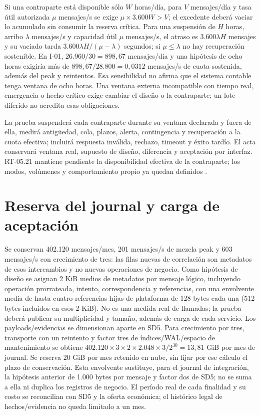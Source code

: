 Si una contraparte está disponible sólo $W$ horas/día, para $V$ mensajes/día y tasa útil autorizada $\mu$ mensajes/s se exige $\mu\times3.600W>V$; el excedente deberá vaciar lo acumulado sin consumir la reserva crítica. Para una suspensión de $H$ horas, arribo $\lambda$ mensajes/s y capacidad útil $\mu$ mensajes/s, el atraso es $3.600\lambda H$ mensajes y su vaciado tarda $3.600\lambda H/(\mu-\lambda)$ segundos; si $\mu\leq\lambda$ no hay recuperación sostenible. En I-01, $26.960/30=898,67$ mensajes/día y una hipótesis de ocho horas exigiría más de $898,67/28.800=0,0312$ mensajes/s de cuota sostenida, además del peak y reintentos. Esa sensibilidad no afirma que el sistema contable tenga ventana de ocho horas. Una ventana externa incompatible con tiempo real, emergencia o hecho crítico exige cambiar el diseño o la contraparte; un lote diferido no acredita esas obligaciones.

La prueba suspenderá cada contraparte durante su ventana declarada y fuera de ella, medirá antigüedad, cola, plazos, alerta, contingencia y recuperación a la cuota efectiva; incluirá respuesta inválida, rechazo, timeout y éxito tardío. El acta conservará ventana real, supuesto de diseño, diferencia y aceptación por interfaz. RT-05.21 mantiene pendiente la disponibilidad efectiva de la contraparte; los modos, volúmenes y comportamiento propio ya quedan definidos \parencite[RT-05.21, p.~13]{pucv-transversal}.

\section*{Reserva del journal y carga de aceptación}
\label{sec:a42-capacidad-journal}

Se conservan 402.120 mensajes/mes, 201 mensajes/s de mezcla peak y 603 mensajes/s con crecimiento de tres: las filas nuevas de correlación son metadatos de esos intercambios y no nuevas operaciones de negocio. Como hipótesis de diseño se asignan 2 KiB medios de metadatos por mensaje lógico, incluyendo operación prorrateada, intento, correspondencia y referencias, con una envolvente media de hasta cuatro referencias hijas de plataforma de 128 bytes cada una (512 bytes incluidos en esos 2 KiB). No es una medida real de llamadas; la prueba deberá publicar su multiplicidad y tamaño, además de carga de cada servicio. Los payloads/evidencias se dimensionan aparte en SD5. Para crecimiento por tres, transporte con un reintento y factor tres de índices/WAL/espacio de mantenimiento se obtiene $402.120\times3\times2\times2.048\times3/2^{30}=13,81$ GiB por mes de journal. Se reserva 20 GiB por mes retenido en nube, sin fijar por ese cálculo el plazo de conservación. Esta envolvente sustituye, para el journal de integración, la hipótesis anterior de 1.000 bytes por mensaje y factor dos de SD5; no se suma a ella ni duplica los registros de negocio. El período real de cada finalidad y su costo se reconcilian con SD5 y la oferta económica; el histórico legal de hechos/evidencia no queda limitado a un mes.

